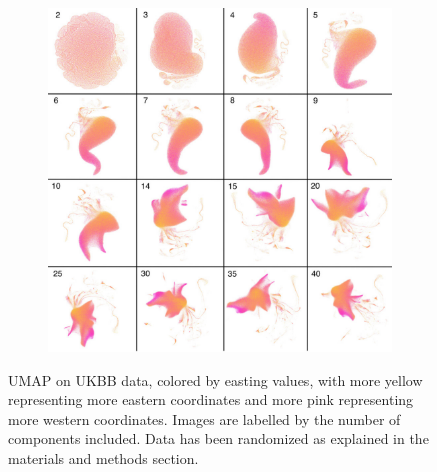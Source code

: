 \documentclass[12pt]{pnas-new}
\begin{document}
\begin{figure}
    \centering
    \begin{subfigure}{\textwidth}
    \includegraphics[width=\textwidth]{images/montage_ukbb_ew_pm.pdf}
    \end{subfigure}
    \caption{UMAP on UKBB data, colored by easting values, with more yellow representing more eastern coordinates and more pink representing more western coordinates. Images are labelled by the number of components included. Data has been randomized as explained in the materials and methods section.}
    \label{fig:supp_montage_ukbb_ew}
\end{figure}
\end{document}
